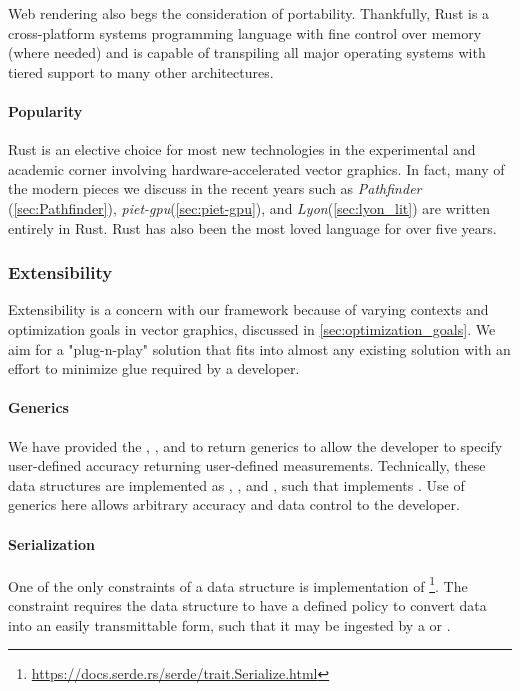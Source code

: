 Web rendering also begs the consideration of portability. Thankfully, Rust is a cross-platform systems programming language with fine control over memory (where needed) and is capable of transpiling all major operating systems with tiered support to many other architectures.

\paragraph{Popularity}
Rust is an elective choice for most new technologies in the experimental and academic corner involving hardware-accelerated vector graphics. In fact, many of the modern pieces we discuss in the recent years such as \textit{Pathfinder} (\cref{sec:Pathfinder}), \textit{piet-gpu}(\cref{sec:piet-gpu}), and \textit{Lyon}(\cref{sec:lyon_lit}) are written entirely in Rust. Rust has also been the most loved language for over five years\cite{StackDeveloperSurvey}.

\subsubsection{Extensibility}
Extensibility is a concern with our framework because of varying contexts and optimization goals in vector graphics, discussed in \cref{sec:optimization_goals}. We aim for a "plug-n-play" solution that fits into almost any existing solution with an effort to minimize glue required by a developer.
\paragraph{Generics}
We have provided the , , and  to return generics to allow the developer to specify user-defined accuracy returning user-defined measurements. Technically, these data structures are implemented as , , and , such that  implements . Use of generics here allows arbitrary accuracy and data control to the developer. 

\paragraph{Serialization}
One of the only constraints of a  data structure is implementation of \footnote{\href{https://docs.serde.rs/serde/trait.Serialize.html}{https://docs.serde.rs/serde/trait.Serialize.html}}. The constraint requires the data structure to have a defined policy to convert data into an easily transmittable form, such that it may be ingested by a  or .

